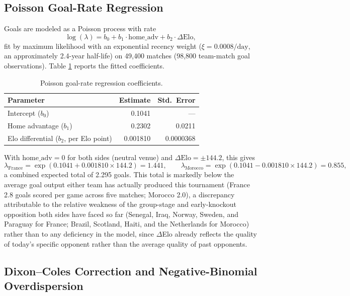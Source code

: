 \documentclass[11pt]{article}
\begin{document}
\subsection{Poisson Goal-Rate Regression}

Goals are modeled as a Poisson process with rate
\[
\log(\lambda) = b_0 + b_1 \cdot \mathrm{home\_adv} + b_2 \cdot \Delta\mathrm{Elo},
\]
fit by maximum likelihood with an exponential recency weight
($\xi = 0.0008\text{/day}$, an approximately 2.4-year half-life) on 49{,}400 matches
(98{,}800 team-match goal observations). Table \ref{tab:poissoncoefs} reports the fitted
coefficients.

\begin{table}[H]
\centering
\caption{Poisson goal-rate regression coefficients.}
\label{tab:poissoncoefs}
\begin{tabular}{lrr}
\toprule
Parameter & Estimate & Std.\ Error \\
\midrule
Intercept ($b_0$) & 0.1041 & --- \\
Home advantage ($b_1$) & 0.2302 & 0.0211 \\
Elo differential ($b_2$, per Elo point) & 0.001810 & 0.0000368 \\
\bottomrule
\end{tabular}
\end{table}

With $\mathrm{home\_adv} = 0$ for both sides (neutral venue) and $\Delta\mathrm{Elo} =
\pm 144.2$, this gives
\[
\lambda_{\text{France}} = \exp(0.1041 + 0.001810 \times 144.2) = 1.441, \qquad
\lambda_{\text{Morocco}} = \exp(0.1041 - 0.001810 \times 144.2) = 0.855,
\]
a combined expected total of 2.295 goals. This total is markedly below the average goal
output either team has actually produced this tournament (France 2.8 goals scored per
game across five matches; Morocco 2.0), a discrepancy attributable to the relative
weakness of the group-stage and early-knockout opposition both sides have faced so far
(Senegal, Iraq, Norway, Sweden, and Paraguay for France; Brazil, Scotland, Haiti, and the
Netherlands for Morocco) rather than to any deficiency in the model, since $\Delta$Elo
already reflects the quality of today's specific opponent rather than the average quality
of past opponents.

\subsection{Dixon--Coles Correction and Negative-Binomial Overdispersion}
\end{document}
